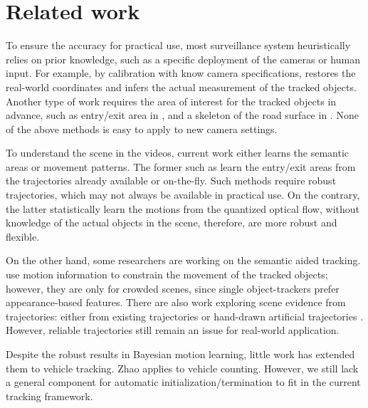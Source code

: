 \section{Related work}

\label{sec:semantic-related}
To ensure the accuracy for practical use, most surveillance system heuristically relies on prior knowledge, such as a specific deployment of the cameras or human input. For example, by calibration with know camera specifications, \cite{cheng2011intelligent,corral2017slot} restores the real-world coordinates and infers the actual measurement of the tracked objects. Another type of work requires the area of interest for the tracked objects in advance, such as entry/exit area in \cite{tamersoy2009robust,rodriguez2010adaptive,mishra2013video}, and a skeleton of the road surface in \cite{bas2007automatic}. None of the above methods is easy to apply to new camera settings.

To understand the scene in the videos, current work either learns the semantic areas or movement patterns. The former such as \cite{tung2011goal,nedrich2013detecting,yang2012multi} learn the entry/exit areas from the trajectories already available or on-the-fly. Such methods require robust trajectories, which may not always be available in practical use.
On the contrary, the latter \cite{wang2009unsupervised,kuettel2010s,hospedales2009markov,liao2015video} statistically learn the motions from the quantized optical flow, without knowledge of the actual objects in the scene, therefore, are more robust and flexible. 

On the other hand, some researchers are working on the semantic aided tracking. \cite{zhao2012tracking,kratz2010tracking} use motion information to constrain the movement of the tracked objects; however, they are only for crowded scenes, since single object-trackers prefer appearance-based features.
There are also work exploring scene evidence from trajectories: either from existing trajectories \cite{song2010online} or hand-drawn artificial trajectories \cite{manen2014appearances}. However, reliable trajectories still remain an issue for real-world application.

Despite the robust results in Bayesian motion learning, little work has extended them to vehicle tracking.
Zhao \etc \cite{zhao2013counting} applies \cite{wang2009unsupervised} to vehicle counting. However, we still lack a general component for automatic initialization/termination to fit in the current tracking framework.
